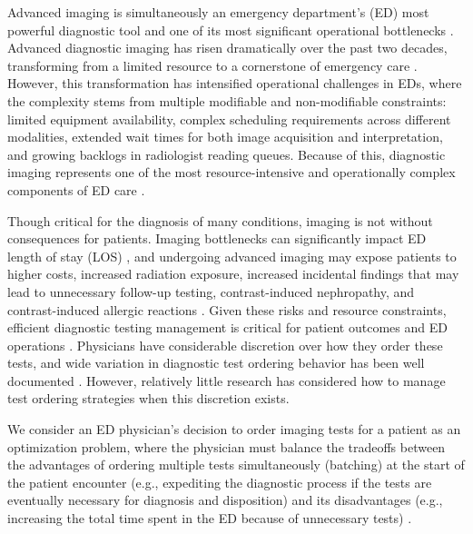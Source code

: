 \documentclass[,,blindrev]{informs}
\begin{document}
Advanced imaging is simultaneously an emergency department's (ED) most
powerful diagnostic tool and one of its most significant operational
bottlenecks \citep{Rogg2017}. Advanced diagnostic imaging has risen
dramatically over the past two decades, transforming from a limited
resource to a cornerstone of emergency care
\citep[\citet{smith-bindman2019trends}]{Juliusson2019}. However, this
transformation has intensified operational challenges in EDs, where the
complexity stems from multiple modifiable and non-modifiable
constraints: limited equipment availability, complex scheduling
requirements across different modalities, extended wait times for both
image acquisition and interpretation, and growing backlogs in
radiologist reading queues. Because of this, diagnostic imaging
represents one of the most resource-intensive and operationally complex
components of ED care \citep[\citet{baloescu2018diagnostic},
\citet{poyiadji2023diagnostic}]{mills2015optimizing}.

Though critical for the diagnosis of many conditions, imaging is not
without consequences for patients. Imaging bottlenecks can significantly
impact ED length of stay (LOS) \citep{Cournane2016}, and undergoing
advanced imaging may expose patients to higher costs, increased
radiation exposure, increased incidental findings that may lead to
unnecessary follow-up testing, contrast-induced nephropathy, and
contrast-induced allergic reactions
\citep[\citet{Raja2014}]{valtchinov2019use}. Given these risks and
resource constraints, efficient diagnostic testing management is
critical for patient outcomes and ED operations \citep{naseim2015}.
Physicians have considerable discretion over how they order these tests,
and wide variation in diagnostic test ordering behavior has been well
documented \citep[\citet{Solomon1998}, \citet{Wennberg1984},
\citet{Daniels1977}]{Miller1994}. However, relatively little research
has considered how to manage test ordering strategies when this
discretion exists.

We consider an ED physician's decision to order imaging tests for a
patient as an optimization problem, where the physician must balance the
tradeoffs between the advantages of ordering multiple tests
simultaneously (batching) at the start of the patient encounter (e.g.,
expediting the diagnostic process if the tests are eventually necessary
for diagnosis and disposition) and its disadvantages (e.g., increasing
the total time spent in the ED because of unnecessary tests)
\citep[\citet{Perotte2018}, \citet{Lyu2017},
\citet{Traub2018}]{Tamburrano2020}.
\end{document}
